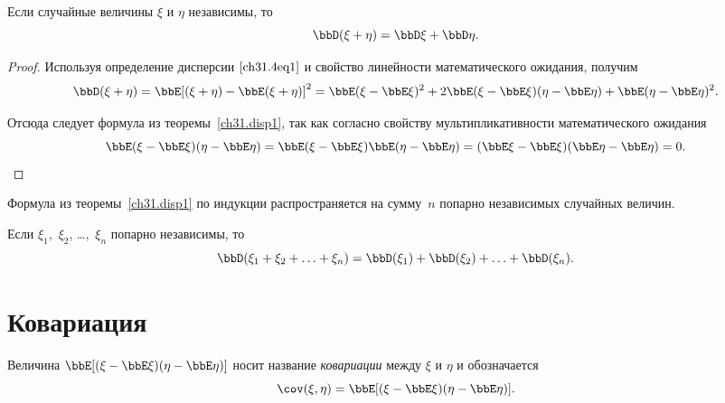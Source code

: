 \begin{thm}\label{ch31.disp1}
Если случайные величины $\xi$ и $\eta$ независимы, то $$\bbD(\xi + \eta) = \bbD\xi + \bbD\eta.$$
\end{thm}
\begin{proof}
Используя определение дисперсии $\eqref{ch31.4eq1}$ и свойство линейности математического ожидания, получим
$$
\bbD(\xi + \eta) = \bbE[(\xi + \eta) - \bbE(\xi + \eta)]^2 = \bbE(\xi - \bbE\xi)^2 + 2\bbE(\xi - \bbE\xi)(\eta - \bbE\eta) + \bbE(\eta  - \bbE\eta)^2.
$$

Отсюда следует формула из теоремы~\ref{ch31.disp1}, так как согласно свойству мультипликативности математического ожидания
\begin{equation*}
\bbE(\xi - \bbE\xi)(\eta - \bbE\eta) = \bbE(\xi - \bbE\xi)\bbE(\eta - \bbE\eta) = (\bbE\xi - \bbE\xi)(\bbE\eta - \bbE\eta) = 0. \qedhere
\end{equation*}
\end{proof}

Формула из теоремы~\ref{ch31.disp1} по индукции распространяется на сумму~$n$ попарно независимых случайных величин. 
\begin{cons}\label{ch31.disp13}
Если $\xi_1$,~$\xi_2$, \ldots,~$\xi_n$ попарно независимы, то 
$$
\bbD(\xi_1 + \xi_2 + \ldots + \xi_n) = \bbD(\xi_1) + \bbD(\xi_2) + \ldots + \bbD(\xi_n).
$$
\end{cons}

\section{Ковариация}
\begin{defn}
Величина $\bbE[(\xi - \bbE\xi)(\eta - \bbE\eta)]$ носит название \textit{ковариации} между $\xi$ и $\eta$ и обозначается $$\cov (\xi,\eta) = \bbE[(\xi - \bbE\xi)(\eta - \bbE\eta)].$$
\end{defn}

